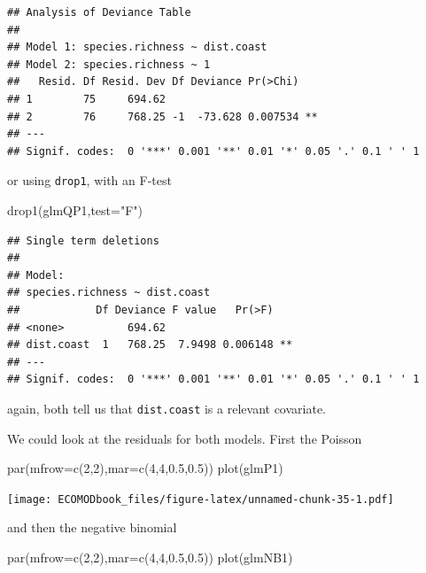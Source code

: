 \documentclass[
]{book}
\newenvironment{Shaded}{\begin{snugshade}}{\end{snugshade}}
\newcommand{\AttributeTok}[1]{\textcolor[rgb]{0.77,0.63,0.00}{#1}}
\newcommand{\DecValTok}[1]{\textcolor[rgb]{0.00,0.00,0.81}{#1}}
\newcommand{\FloatTok}[1]{\textcolor[rgb]{0.00,0.00,0.81}{#1}}
\newcommand{\FunctionTok}[1]{\textcolor[rgb]{0.00,0.00,0.00}{#1}}
\newcommand{\NormalTok}[1]{#1}
\newcommand{\StringTok}[1]{\textcolor[rgb]{0.31,0.60,0.02}{#1}}
\begin{document}
\begin{verbatim}
## Analysis of Deviance Table
## 
## Model 1: species.richness ~ dist.coast
## Model 2: species.richness ~ 1
##   Resid. Df Resid. Dev Df Deviance Pr(>Chi)   
## 1        75     694.62                        
## 2        76     768.25 -1  -73.628 0.007534 **
## ---
## Signif. codes:  0 '***' 0.001 '**' 0.01 '*' 0.05 '.' 0.1 ' ' 1
\end{verbatim}

or using \texttt{drop1}, with an F-test

\begin{Shaded}
\begin{Highlighting}[]
\FunctionTok{drop1}\NormalTok{(glmQP1,}\AttributeTok{test=}\StringTok{"F"}\NormalTok{)}
\end{Highlighting}
\end{Shaded}

\begin{verbatim}
## Single term deletions
## 
## Model:
## species.richness ~ dist.coast
##            Df Deviance F value   Pr(>F)   
## <none>          694.62                    
## dist.coast  1   768.25  7.9498 0.006148 **
## ---
## Signif. codes:  0 '***' 0.001 '**' 0.01 '*' 0.05 '.' 0.1 ' ' 1
\end{verbatim}

again, both tell us that \texttt{dist.coast} is a relevant covariate.

We could look at the residuals for both models. First the Poisson

\begin{Shaded}
\begin{Highlighting}[]
\FunctionTok{par}\NormalTok{(}\AttributeTok{mfrow=}\FunctionTok{c}\NormalTok{(}\DecValTok{2}\NormalTok{,}\DecValTok{2}\NormalTok{),}\AttributeTok{mar=}\FunctionTok{c}\NormalTok{(}\DecValTok{4}\NormalTok{,}\DecValTok{4}\NormalTok{,}\FloatTok{0.5}\NormalTok{,}\FloatTok{0.5}\NormalTok{))}
\FunctionTok{plot}\NormalTok{(glmP1)}
\end{Highlighting}
\end{Shaded}

\texttt{[image: ECOMODbook\_files/figure-latex/unnamed-chunk-35-1.pdf]}

and then the negative binomial

\begin{Shaded}
\begin{Highlighting}[]
\FunctionTok{par}\NormalTok{(}\AttributeTok{mfrow=}\FunctionTok{c}\NormalTok{(}\DecValTok{2}\NormalTok{,}\DecValTok{2}\NormalTok{),}\AttributeTok{mar=}\FunctionTok{c}\NormalTok{(}\DecValTok{4}\NormalTok{,}\DecValTok{4}\NormalTok{,}\FloatTok{0.5}\NormalTok{,}\FloatTok{0.5}\NormalTok{))}
\FunctionTok{plot}\NormalTok{(glmNB1)}
\end{Highlighting}
\end{Shaded}
\end{document}
